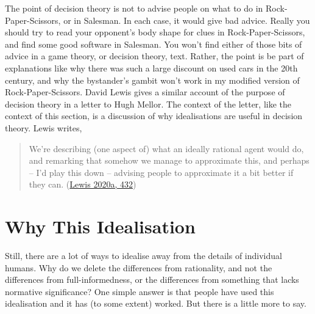 \documentclass[
  12pt,
  letterpaper,
  DIV=11,
  numbers=noendperiod]{scrreprt}
\begin{document}
The point of decision theory is not to advise people on what to do in
Rock-Paper-Scissors, or in Salesman. In each case, it would give bad
advice. Really you should try to read your opponent's body shape for
clues in Rock-Paper-Scissors, and find some good software in Salesman.
You won't find either of those bits of advice in a game theory, or
decision theory, text. Rather, the point is be part of explanations like
why there was such a large discount on used cars in the 20th century,
and why the bystander's gambit won't work in my modified version of
Rock-Paper-Scissors. David Lewis gives a similar account of the purpose
of decision theory in a letter to Hugh Mellor. The context of the
letter, like the context of this section, is a discussion of why
idealisations are useful in decision theory. Lewis writes,

\begin{quote}
We're describing (one aspect of) what an ideally rational agent would
do, and remarking that somehow we manage to approximate this, and
perhaps -- I'd play this down -- advising people to approximate it a bit
better if they can. (\protect\hyperlink{ref-Lewis1981Mellor}{Lewis
2020a, 432})
\end{quote}

\hypertarget{sec-why-this-ideal}{%
\section{Why This Idealisation}\label{sec-why-this-ideal}}

Still, there are a lot of ways to idealise away from the details of
individual humans. Why do we delete the differences from rationality,
and not the differences from full-informedness, or the differences from
something that lacks normative significance? One simple answer is that
people have used this idealisation and it has (to some extent) worked.
But there is a little more to say.
\end{document}
